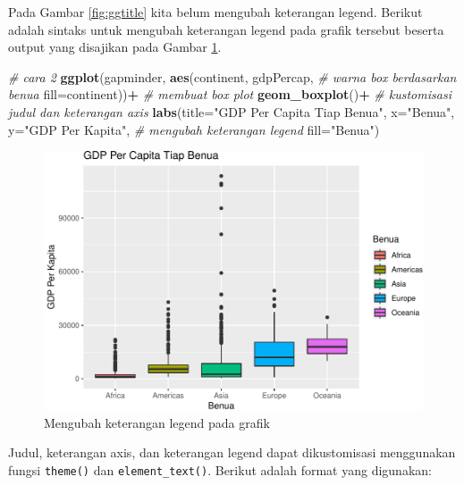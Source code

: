 \documentclass[]{book}
\newenvironment{Shaded}{\begin{snugshade}}{\end{snugshade}}
\newcommand{\KeywordTok}[1]{\textcolor[rgb]{0.13,0.29,0.53}{\textbf{#1}}}
\newcommand{\DataTypeTok}[1]{\textcolor[rgb]{0.13,0.29,0.53}{#1}}
\newcommand{\StringTok}[1]{\textcolor[rgb]{0.31,0.60,0.02}{#1}}
\newcommand{\CommentTok}[1]{\textcolor[rgb]{0.56,0.35,0.01}{\textit{#1}}}
\newcommand{\OperatorTok}[1]{\textcolor[rgb]{0.81,0.36,0.00}{\textbf{#1}}}
\newcommand{\NormalTok}[1]{#1}
\begin{document}
Pada Gambar \ref{fig:ggtitle} kita belum mengubah keterangan legend.
Berikut adalah sintaks untuk mengubah keterangan legend pada grafik
tersebut beserta output yang disajikan pada Gambar \ref{fig:ggtitle2}.

\begin{Shaded}
\begin{Highlighting}[]
\CommentTok{# cara 2}
\KeywordTok{ggplot}\NormalTok{(gapminder, }\KeywordTok{aes}\NormalTok{(continent, gdpPercap, }
                      \CommentTok{# warna box berdasarkan benua}
                      \DataTypeTok{fill=}\NormalTok{continent))}\OperatorTok{+}
\StringTok{  }\CommentTok{# membuat box plot}
\StringTok{  }\KeywordTok{geom_boxplot}\NormalTok{()}\OperatorTok{+}
\StringTok{  }\CommentTok{# kustomisasi judul dan keterangan axis}
\StringTok{  }\KeywordTok{labs}\NormalTok{(}\DataTypeTok{title=}\StringTok{"GDP Per Capita Tiap Benua"}\NormalTok{,}
       \DataTypeTok{x=}\StringTok{"Benua"}\NormalTok{, }\DataTypeTok{y=}\StringTok{"GDP Per Kapita"}\NormalTok{,}
       \CommentTok{# mengubah keterangan legend}
       \DataTypeTok{fill=}\StringTok{"Benua"}\NormalTok{)}
\end{Highlighting}
\end{Shaded}

\begin{figure}

{\centering \includegraphics[width=0.7\linewidth]{EnvStat_files/figure-latex/ggtitle2-1} 

}

\caption{Mengubah keterangan legend pada grafik}\label{fig:ggtitle2}
\end{figure}

Judul, keterangan axis, dan keterangan legend dapat dikustomisasi
menggunakan fungsi \texttt{theme()} dan \texttt{element\_text()}.
Berikut adalah format yang digunakan:
\end{document}
